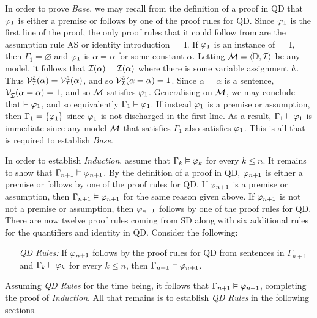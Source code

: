 In order to prove \textit{Base}, we may recall from the definition of a proof in QD that $\varphi_1$ is either a premise or follows by one of the proof rules for QD. 
Since $\varphi_1$ is the first line of the proof, the only proof rules that it could follow from are the assumption rule AS or identity introduction $=$I.
If $\varphi_1$ is an instance of $=$I, then $\Gamma_1=\varnothing$ and $\varphi_1$ is $\alpha=\alpha$ for some constant $\alpha$. 
Letting $\mathcal{M}=\langle\mathbb{D},\mathcal{I}\rangle$ be any model, it follows that $\mathcal{I}(\alpha)=\mathcal{I}(\alpha)$ where there is some variable assignment $\hat{a}$.
Thus $\mathcal{V}_{\mathcal{I}}^{\hat{a}}(\alpha)=\mathcal{V}_{\mathcal{I}}^{\hat{a}}(\alpha)$, and so $\mathcal{V}_{\mathcal{I}}^{\hat{a}}(\alpha=\alpha)=1$.
Since $\alpha=\alpha$ is a sentence, $\mathcal{V}_{\mathcal{I}}^{}(\alpha=\alpha)=1$, and so $\mathcal{M}$ satisfies $\varphi_1$.
Generalising on $\mathcal{M}$, we may conclude that $\vDash \varphi_1$, and so equivalently $\Gamma_1 \vDash \varphi_1$.
If instead $\varphi_1$ is a premise or assumption, then $\Gamma_1=\lbrace\varphi_1\rbrace$ since $\varphi_1$ is not discharged in the first line.
As a result, $\Gamma_1 \vDash \varphi_1$ is immediate since any model $\mathcal{M}$ that satisfies $\Gamma_1$ also satisfies $\varphi_1$.
This is all that is required to establish \textit{Base}.

In order to establish \textit{Induction}, assume that $\Gamma_k \vDash \varphi_k$ for every $k\leq n$. 
It remains to show that $\Gamma_{n+1} \vDash \varphi_{n+1}$.
By the definition of a proof in QD, $\varphi_{n+1}$ is either a premise or follows by one of the proof rules for QD. 
If $\varphi_{n+1}$ is a premise or assumption, then $\Gamma_{n+1} \vDash \varphi_{n+1}$ for the same reason given above.
If $\varphi_{n+1}$ is not not a premise or assumption, then $\varphi_{n+1}$ follows by one of the proof rules for QD. 
There are now twelve proof rules coming from SD along with six additional rules for the quantifiers and identity in QD.
Consider the following:
\begin{enumerate}[leftmargin=1.5in]
  \item[\it QD Rules:] If $\varphi_{n+1}$ follows by the proof rules for QD from sentences in $\Gamma_{n+1}$ and $\Gamma_k \vDash \varphi_k$ for every $k\leq n$, then $\Gamma_{n+1} \vDash \varphi_{n+1}$.
\end{enumerate}
Assuming \textit{QD Rules} for the time being, it follows that $\Gamma_{n+1} \vDash \varphi_{n+1}$, completing the proof of \textit{Induction}.
All that remains is to establish \textit{QD Rules} in the following sections.





